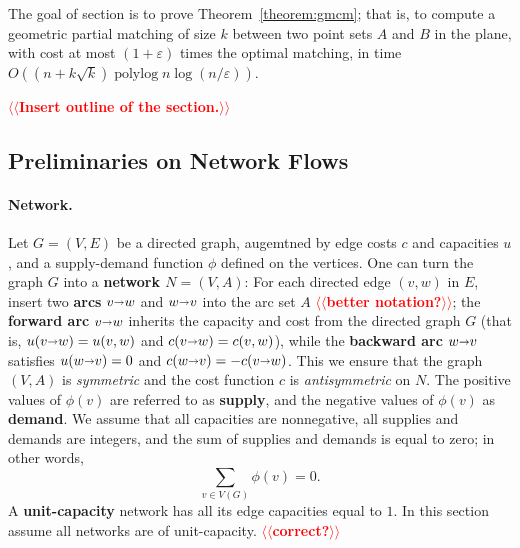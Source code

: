 \documentclass[11pt]{article}
\makeatletter
\def\polylog{\mathop{\mathrm{polylog}}}
\def\eps{\varepsilon}
\def\fsupply{\phi}
\def\arcto{\mathord\shortrightarrow}
\def\arc#1#2{#1\arcto#2}
\theoremstyle{plain}
\newtheorem{theorem}[lemma]{Theorem}
\numberwithin{figure}{section}
\def\EMPH#1{\textbf{\boldmath #1}}
\def\n@te#1{\textsf{\boldmath \textbf{$\langle\!\langle$#1$\rangle\!\rangle$}}\leavevmode}
\def\note#1{\textcolor{red}{\n@te{#1}}}
\makeatother
\begin{document}
The goal of section is to prove Theorem~\ref{theorem:gmcm}; that is, to compute a geometric partial matching of size $k$ between two point sets $A$ and $B$ in the plane, with cost at most $(1+\eps)$ times the optimal matching, in time $O((n + k\sqrt{k})\polylog n \log(n/\eps))$.
%

\note{Insert outline of the section.}

\subsection{Preliminaries on Network Flows}

\paragraph{Network.}
Let $G=(V,E)$ be a directed graph, augemtned by edge costs $c$ and capacities $u$, and a supply-demand function $\fsupply$ defined on the vertices.
%
One can turn the graph $G$ into a \EMPH{network $N = (V, A)$}:
For each directed edge $(v,w)$ in $E$, insert two \EMPH{arcs} $\arc vw$ and $\arc wv$ into the arc set $A$ \note{better notation?}; the \EMPH{forward arc} $\arc vw$ inherits the capacity and cost from the directed graph $G$ (that is, $u(\arc vw) = u(v,w)$ and $c(\arc vw) = c(v,w)$), while the \EMPH{backward arc} $\arc wv$ satisfies $u(\arc wv) = 0$ and $c(\arc wv) = -c(\arc vw)$.  This we ensure that the graph $(V,A)$ is \emph{symmetric} and the cost function $c$ is \emph{antisymmetric} on $N$.
%
The positive values of $\fsupply(v)$ are referred to as \EMPH{supply}, and the negative values of $\fsupply(v)$ as \EMPH{demand}.
We assume that all capacities are nonnegative, all supplies and demands are integers, and the sum of supplies and demands is equal to zero; in other words,
\[
\sum_{v \in V(G)} \fsupply(v) = 0.
\]
%
A \EMPH{unit-capacity} network has all its edge capacities equal to $1$.
In this section assume all networks are of unit-capacity. \note{correct?}
\end{document}
